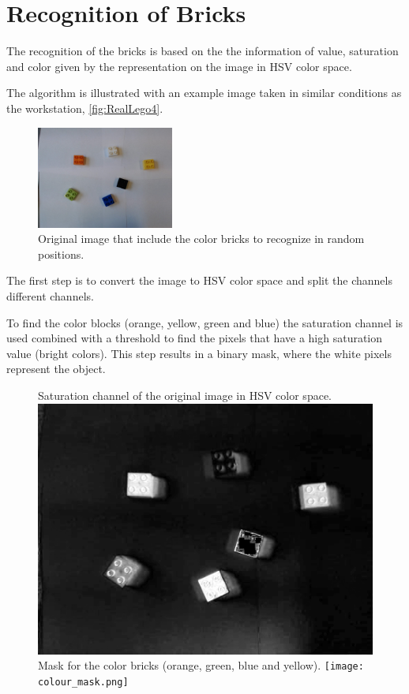 \chapter{Recognition of Bricks}
The recognition of the bricks is based on the the information of value, saturation and color given by the representation on the image in HSV color space.

The algorithm is illustrated with an example image taken in similar conditions as the workstation, \autoref{fig:RealLego4}.

\begin{figure}[H]
    \includegraphics[width=0.4\textwidth]{figures/RealLego4.jpg}
    \caption{Original image that include the color bricks to recognize in random positions.}
    \label{fig:RealLego4}
\end{figure}

The first step is to convert the image to HSV color space and split the channels different channels.

To find the color blocks (orange, yellow, green and blue) the saturation channel is used combined with a threshold to find the pixels that have a high saturation value (bright colors). This step results in a binary mask, where the white pixels represent the object.

\begin{figure}[H]
    \captionbox  %
    { 
        Saturation channel of the original image in HSV color space.              
        \label{fig:saturation}                                  
    }                                                                 
    {                                                                  
        \includegraphics[width=.4\textwidth]{figures/saturation.png}         
    }                                                                    
    \hspace{5pt}                                                          
    \captionbox
    {      
        Mask for the color bricks (orange, green, blue and yellow). 
        \label{fig:colour_mask}                                     
    }
    {
        \texttt{[image: colour\_mask.png]}            
    }                                                                             
\end{figure}

